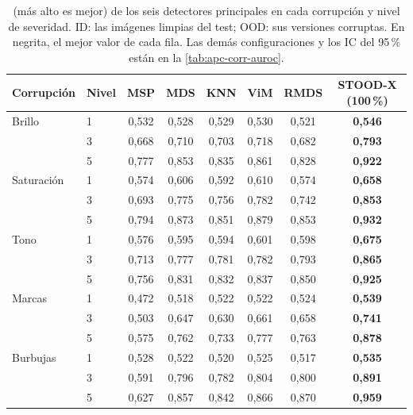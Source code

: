 \begin{table}
\centering
\scriptsize
\setlength{\tabcolsep}{3pt}
\caption{\AUROC (más alto es mejor) de los seis detectores principales en cada corrupción y nivel de severidad. ID: las imágenes limpias del test; OOD: sus versiones corruptas. En negrita, el mejor valor de cada fila. Las demás configuraciones y los IC del 95\,\% están en la \cref{tab:apc-corr-auroc}.}
\label{tab:ood-corr-auroc}
\begin{tabular*}{\linewidth}{@{\extracolsep{\fill}}llcccccc}
\toprule
Corrupción & Nivel & MSP & MDS & KNN & ViM & RMDS & STOOD-X (100\,\%) \\
\midrule
Brillo & 1 & 0{,}532 & 0{,}528 & 0{,}529 & 0{,}530 & 0{,}521 & \textbf{0{,}546} \\
 & 3 & 0{,}668 & 0{,}710 & 0{,}703 & 0{,}718 & 0{,}682 & \textbf{0{,}793} \\
 & 5 & 0{,}777 & 0{,}853 & 0{,}835 & 0{,}861 & 0{,}828 & \textbf{0{,}922} \\
\addlinespace[2pt]
Saturación & 1 & 0{,}574 & 0{,}606 & 0{,}592 & 0{,}610 & 0{,}574 & \textbf{0{,}658} \\
 & 3 & 0{,}693 & 0{,}775 & 0{,}756 & 0{,}782 & 0{,}742 & \textbf{0{,}853} \\
 & 5 & 0{,}794 & 0{,}873 & 0{,}851 & 0{,}879 & 0{,}853 & \textbf{0{,}932} \\
\addlinespace[2pt]
Tono & 1 & 0{,}576 & 0{,}595 & 0{,}594 & 0{,}601 & 0{,}598 & \textbf{0{,}675} \\
 & 3 & 0{,}713 & 0{,}777 & 0{,}781 & 0{,}782 & 0{,}793 & \textbf{0{,}865} \\
 & 5 & 0{,}756 & 0{,}831 & 0{,}832 & 0{,}837 & 0{,}850 & \textbf{0{,}925} \\
\addlinespace[2pt]
Marcas & 1 & 0{,}472 & 0{,}518 & 0{,}522 & 0{,}522 & 0{,}524 & \textbf{0{,}539} \\
 & 3 & 0{,}503 & 0{,}647 & 0{,}630 & 0{,}661 & 0{,}658 & \textbf{0{,}741} \\
 & 5 & 0{,}575 & 0{,}762 & 0{,}733 & 0{,}777 & 0{,}763 & \textbf{0{,}878} \\
\addlinespace[2pt]
Burbujas & 1 & 0{,}528 & 0{,}522 & 0{,}520 & 0{,}525 & 0{,}517 & \textbf{0{,}535} \\
 & 3 & 0{,}591 & 0{,}796 & 0{,}782 & 0{,}804 & 0{,}800 & \textbf{0{,}891} \\
 & 5 & 0{,}627 & 0{,}857 & 0{,}842 & 0{,}866 & 0{,}870 & \textbf{0{,}959} \\

\end{tabular*}
\end{table}
